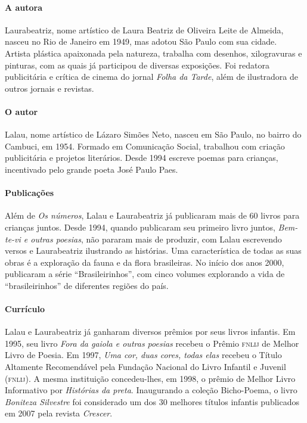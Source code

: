 \documentclass[11pt]{extarticle}
\begin{document}
\paragraph{A autora} Laurabeatriz, nome artístico de Laura Beatriz de Oliveira Leite de Almeida, nasceu no Rio de Janeiro em 1949, mas adotou São Paulo com sua cidade. Artista plástica apaixonada pela natureza, trabalha com desenhos, xilogravuras e pinturas, com as quais já participou de diversas exposições. Foi redatora publicitária e crítica de cinema do jornal \textit{Folha da Tarde}, além de ilustradora de outros jornais e revistas.

\paragraph{O autor} Lalau, nome artístico de Lázaro Simões Neto, nasceu em São Paulo, no bairro do Cambuci, em 1954. Formado em Comunicação Social, trabalhou com criação publicitária e projetos literários. Desde 1994 escreve poemas para crianças, incentivado pelo grande poeta José Paulo Paes.

\paragraph{Publicações} Além de \textit{Os números}, Lalau e Laurabeatriz já publicaram mais de 60 livros para crianças juntos. Desde 1994, quando publicaram seu primeiro livro juntos, \textit{Bem-te-vi e outras poesias}, não pararam mais de produzir, com Lalau escrevendo versos e Laurabeatriz ilustrando as histórias. Uma característica de todas as suas obras é a exploração da fauna e da flora brasileiras. No início dos anos 2000, publicaram a série ``Brasileirinhos'', com cinco volumes explorando a vida de ``brasileirinhos'' de diferentes regiões do país. 

\paragraph{Currículo} Lalau e Laurabeatriz já ganharam diversos prêmios por seus livros infantis. Em 1995, seu livro \textit{Fora da gaiola e outras poesias} recebeu o Prêmio \textsc{fnlij} de Melhor Livro de Poesia. Em 1997, \textit{Uma cor, duas cores, todas elas} recebeu o Título Altamente Recomendável pela Fundação Nacional do Livro Infantil e Juvenil (\textsc{fnlij}). A mesma instituição concedeu-lhes, em 1998, o prêmio de Melhor Livro Informativo por \textit{Histórias da preta}. Inaugurando a coleção Bicho-Poema, o livro \textit{Boniteza Silvestre} foi considerado um dos 30 melhores títulos infantis publicados em 2007 pela revista \textit{Crescer}. 
 
\end{document}
